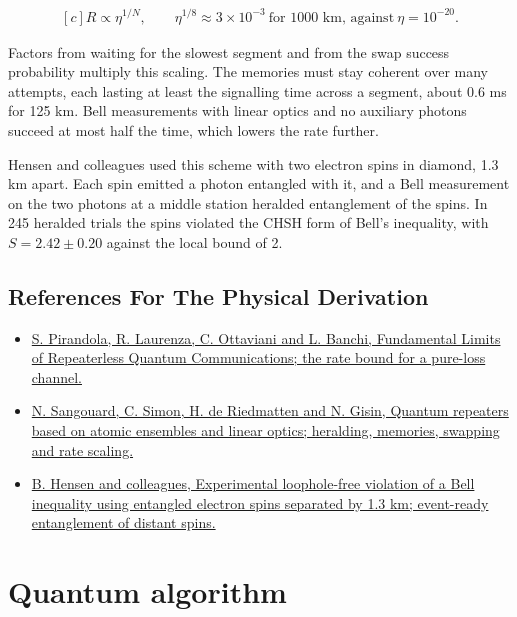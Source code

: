 \documentclass[11pt,oneside]{book}
\newenvironment{centeredalign}{\[\begin{gathered}[c]}{\end{gathered}\]}
\begin{document}
\begin{centeredalign}
R\propto\eta^{1/N},\qquad \eta^{1/8}\approx3\times10^{-3}\ \text{for 1000 km, against}\ \eta=10^{-20}.
\end{centeredalign}

Factors from waiting for the slowest segment and from the swap success probability multiply this scaling. The memories must stay coherent over many attempts, each lasting at least the signalling time across a segment, about 0.6 ms for 125 km. Bell measurements with linear optics and no auxiliary photons succeed at most half the time, which lowers the rate further.

Hensen and colleagues used this scheme with two electron spins in diamond, 1.3 km apart. Each spin emitted a photon entangled with it, and a Bell measurement on the two photons at a middle station heralded entanglement of the spins. In 245 heralded trials the spins violated the CHSH form of Bell's inequality, with \(S=2.42\pm0.20\) against the local bound of 2.

\subsection*{References For The Physical Derivation}
\begin{itemize}
\item \href{https://arxiv.org/abs/1510.08863}{S. Pirandola, R. Laurenza, C. Ottaviani and L. Banchi, Fundamental Limits of Repeaterless Quantum Communications; the rate bound for a pure-loss channel.}
\item \href{https://arxiv.org/abs/0906.2699}{N. Sangouard, C. Simon, H. de Riedmatten and N. Gisin, Quantum repeaters based on atomic ensembles and linear optics; heralding, memories, swapping and rate scaling.}
\item \href{https://arxiv.org/abs/1508.05949}{B. Hensen and colleagues, Experimental loophole-free violation of a Bell inequality using entangled electron spins separated by 1.3 km; event-ready entanglement of distant spins.}
\end{itemize}





\clearpage

\section{Quantum algorithm}

\label{topic:quantum-algorithm}
\end{document}
